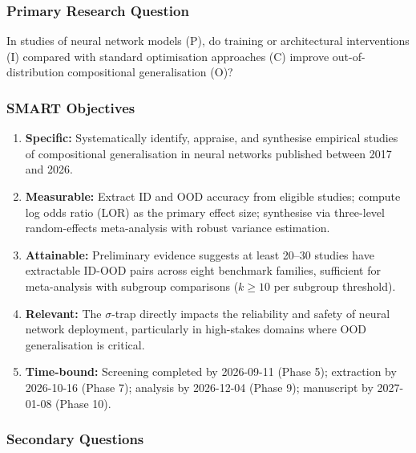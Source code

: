 \subsubsection{Primary Research Question}

In studies of neural network models (P), do training or architectural interventions (I) compared with standard optimisation approaches (C) improve out-of-distribution compositional generalisation (O)?

\subsubsection{SMART Objectives}

\begin{enumerate}
\item \textbf{Specific:} Systematically identify, appraise, and synthesise empirical studies of compositional generalisation in neural networks published between 2017 and 2026.
\item \textbf{Measurable:} Extract ID and OOD accuracy from eligible studies; compute log odds ratio (LOR) as the primary effect size; synthesise via three-level random-effects meta-analysis with robust variance estimation.
\item \textbf{Attainable:} Preliminary evidence suggests at least 20--30 studies have extractable ID-OOD pairs across eight benchmark families, sufficient for meta-analysis with subgroup comparisons ($k \geq 10$ per subgroup threshold).
\item \textbf{Relevant:} The $\sigma$-trap directly impacts the reliability and safety of neural network deployment, particularly in high-stakes domains where OOD generalisation is critical.
\item \textbf{Time-bound:} Screening completed by 2026-09-11 (Phase 5); extraction by 2026-10-16 (Phase 7); analysis by 2026-12-04 (Phase 9); manuscript by 2027-01-08 (Phase 10).
\end{enumerate}

\subsubsection{Secondary Questions}

